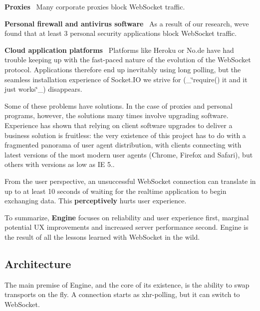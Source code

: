 \begin{DoxyEnumerate}
\item {\bfseries Proxies}~\newline
 Many corporate proxies block Web\+Socket traffic.
\item {\bfseries Personal firewall and antivirus software}~\newline
 As a result of our research, we\textquotesingle{}ve found that at least 3 personal security applications block Web\+Socket traffic.
\item {\bfseries Cloud application platforms}~\newline
 Platforms like Heroku or No.\+de have had trouble keeping up with the fast-\/paced nature of the evolution of the Web\+Socket protocol. Applications therefore end up inevitably using long polling, but the seamless installation experience of Socket.\+IO we strive for (\+\_\+\char`\"{}require() it and it just works\char`\"{}\+\_\+) disappears.
\end{DoxyEnumerate}

Some of these problems have solutions. In the case of proxies and personal programs, however, the solutions many times involve upgrading software. Experience has shown that relying on client software upgrades to deliver a business solution is fruitless\+: the very existence of this project has to do with a fragmented panorama of user agent distribution, with clients connecting with latest versions of the most modern user agents (Chrome, Firefox and Safari), but others with versions as low as IE 5..

From the user perspective, an unsuccessful Web\+Socket connection can translate in up to at least 10 seconds of waiting for the realtime application to begin exchanging data. This {\bfseries perceptively} hurts user experience.

To summarize, {\bfseries Engine} focuses on reliability and user experience first, marginal potential UX improvements and increased server performance second. {\ttfamily Engine} is the result of all the lessons learned with Web\+Socket in the wild.

\subsection*{Architecture}

The main premise of {\ttfamily Engine}, and the core of its existence, is the ability to swap transports on the fly. A connection starts as xhr-\/polling, but it can switch to Web\+Socket.

